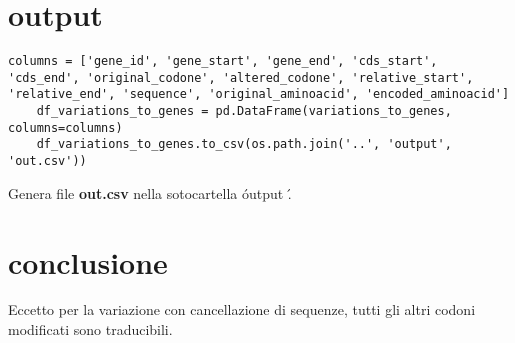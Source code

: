 \documentclass[11pt,italian]{article}
\begin{document}
\section{output}
\begin{lstlisting}[basicstyle=\small\ttfamily,caption=Generazione di output,label=code:output]
	columns = ['gene_id', 'gene_start', 'gene_end', 'cds_start', 'cds_end', 'original_codone', 'altered_codone', 'relative_start', 'relative_end', 'sequence', 'original_aminoacid', 'encoded_aminoacid']
	df_variations_to_genes = pd.DataFrame(variations_to_genes, columns=columns)
	df_variations_to_genes.to_csv(os.path.join('..', 'output', 'out.csv'))
\end{lstlisting}	
Genera file \textbf{out.csv} nella sotocartella \' output \' .

\section{conclusione}
Eccetto per la variazione con cancellazione di sequenze, tutti gli altri codoni modificati sono traducibili.
\end{document}
